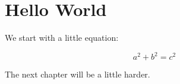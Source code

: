 \documentclass[11pt]{article}
\begin{document}
\section{Hello World}

We start with a little equation:

\begin{equation}
	a^2 + b^2 = c^2
\end{equation}

The next chapter will be a little harder. 
\end{document}
